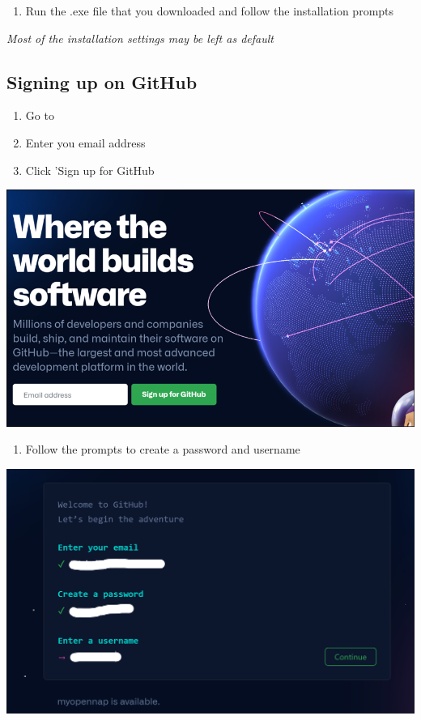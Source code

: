 \documentclass[
]{book}
\providecommand{\tightlist}{%
  \setlength{\itemsep}{0pt}\setlength{\parskip}{0pt}}
\begin{document}
\begin{enumerate}
\def\labelenumi{\arabic{enumi}.}
\setcounter{enumi}{3}
\tightlist
\item
  Run the .exe file that you downloaded and follow the installation prompts
\end{enumerate}

\emph{Most of the installation settings may be left as default}

\hypertarget{signing-up-on-github}{%
\subsection{Signing up on GitHub}\label{signing-up-on-github}}

\begin{enumerate}
\def\labelenumi{\arabic{enumi}.}
\tightlist
\item
  Go to \href{https://github.com/}{}\\
\item
  Enter you email address\\
\item
  Click 'Sign up for GitHub
\end{enumerate}

\includegraphics{tutorial_screenshots/gh_signup.png}

\begin{enumerate}
\def\labelenumi{\arabic{enumi}.}
\setcounter{enumi}{2}
\tightlist
\item
  Follow the prompts to create a password and username
\end{enumerate}

\includegraphics{tutorial_screenshots/gh_set_profile.png}
\end{document}
